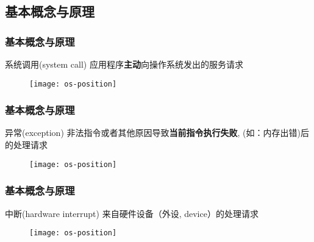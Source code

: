 \subsection{基本概念与原理} %

\begin{frame}[plain,t]
	
	\frametitle{基本概念与原理}
	
	
	\begin{block}{系统调用(system call)}
		应用程序\textbf{主动}向操作系统发出的服务请求
	\end{block} 
	
	
	\begin{figure}
		\centering
		\texttt{[image: os-position]}
	\end{figure}
	
\end{frame}

\begin{frame}[plain,t]
	
	\frametitle{基本概念与原理}
	
	
	\begin{block}{异常(exception)}
		非法指令或者其他原因导致\textbf{当前指令执行失败},
		(如：内存出错)后的处理请求
	\end{block} 
	
	
	\begin{figure}
		\centering
		\texttt{[image: os-position]}
	\end{figure}
	
\end{frame}

\begin{frame}[plain,t]
	
	\frametitle{基本概念与原理}
	
	
	\begin{block}{中断(hardware interrupt)}
		来自硬件设备（外设, device）的处理请求
	\end{block} 
	
	
	\begin{figure}
		\centering
		\texttt{[image: os-position]}
	\end{figure}
	
\end{frame}

